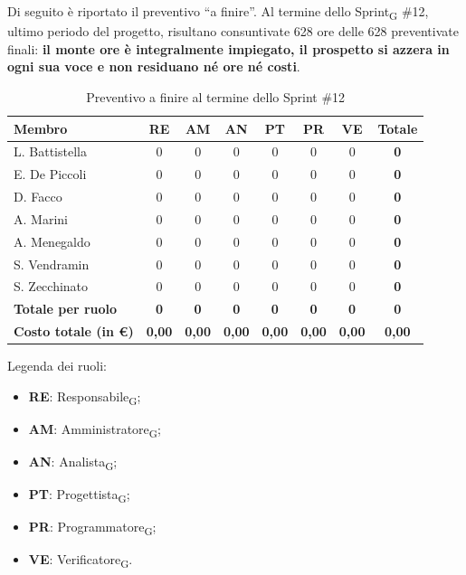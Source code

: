 ﻿\documentclass[a4paper, 10pt, colorlinks=true, linkcolor=black, urlcolor=blue, citecolor=blue, hidelinks]{article}
\renewcommand{\arraystretch}{1.2}
\begin{document}
Di seguito è riportato il preventivo ``a finire''. Al termine dello Sprint\textsubscript{G} \#12, ultimo periodo del progetto, risultano consuntivate 628 ore delle 628 preventivate finali: \textbf{il monte ore è integralmente impiegato, il prospetto si azzera in ogni sua voce e non residuano né ore né costi}.

\begin{table}[H]
    \centering
    \renewcommand{\arraystretch}{1.3}
    \begin{tabularx}{\textwidth}{|L|c|c|c|c|c|c|c|}
        \hline
        \textbf{Membro} & \textbf{RE} & \textbf{AM} & \textbf{AN} & \textbf{PT} & \textbf{PR} & \textbf{VE} & \textbf{Totale} \\
        \hline
        L. Battistella & 0 & 0 & 0 & 0 & 0 & 0 & \textbf{0} \\
        \hline
        E. De Piccoli & 0 & 0 & 0 & 0 & 0 & 0 & \textbf{0} \\
        \hline
        D. Facco & 0 & 0 & 0 & 0 & 0 & 0 & \textbf{0} \\
        \hline
        A. Marini & 0 & 0 & 0 & 0 & 0 & 0 & \textbf{0} \\
        \hline
        A. Menegaldo & 0 & 0 & 0 & 0 & 0 & 0 & \textbf{0} \\
        \hline
        S. Vendramin & 0 & 0 & 0 & 0 & 0 & 0 & \textbf{0} \\
        \hline
        S. Zecchinato & 0 & 0 & 0 & 0 & 0 & 0 & \textbf{0} \\
        \hline
        \textbf{Totale per ruolo} & \textbf{0} & \textbf{0} & \textbf{0} & \textbf{0} & \textbf{0} & \textbf{0} & \textbf{0} \\
        \hline
        \textbf{Costo totale (in €)} & \textbf{0,00} & \textbf{0,00} & \textbf{0,00} & \textbf{0,00} & \textbf{0,00} & \textbf{0,00} & \textbf{0,00} \\
        \hline
    \end{tabularx}
    \caption{Preventivo a finire al termine dello Sprint \#12}
\end{table}

\noindent
Legenda dei ruoli:
\begin{itemize}
    \item \textbf{RE}: Responsabile\textsubscript{G};
    \item \textbf{AM}: Amministratore\textsubscript{G};
    \item \textbf{AN}: Analista\textsubscript{G};
    \item \textbf{PT}: Progettista\textsubscript{G};
    \item \textbf{PR}: Programmatore\textsubscript{G};
    \item \textbf{VE}: Verificatore\textsubscript{G}.
\end{itemize}
\end{document}
